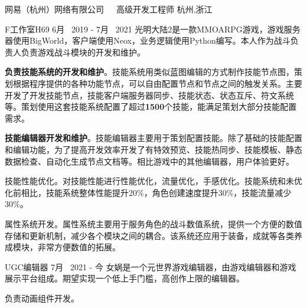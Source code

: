 


\begin{cventries}

\cventrycompany
{网易（杭州）网络有限公司~~~高级开发工程师} %
{杭州,浙江} %

\cventryproject
{F工作室H69} %
{6月~ 2019 - 7月~ 2021} %
{光明大陆2是一款MMOARPG游戏，游戏服务器使用BigWorld，客户端使用Neox，业务逻辑使用Python编写。本人作为战斗负责人负责游戏战斗模块的开发和维护。}
{ %
	\begin{cvitems}
		\item {\textbf{负责技能系统的开发和维护}。技能系统用类似蓝图编辑的方式制作技能节点图，策划根据程序提供的各种功能节点，可以自由配置节点和节点之间的触发关系。主要开发了开发技能节点，技能客户端服务器同步、技能状态、状态互斥、符文系统等。策划使用这套技能系统配置了超过\textbf{1500}个技能，能满足策划大部分技能配置需求。}
		\item{\textbf{技能编辑器开发和维护}。技能编辑器主要用于策划配置技能。除了基础的技能配置和编辑功能，为了提高开发效率开发了有特效预览、技能热同步、技能模板、静态数据检查、自动化生成节点文档等。相比游戏中的其他编辑器，用户体验更好。}
		\item{技能性能优化。对技能性能进行性能优化，流量优化，手感优化。技能系统和未优化前相比，技能系统整体性能提升20\%，角色创建速度提升30\%，技能流量减少30\%。}
		\item{属性系统开发。属性系统主要用于服务角色的战斗数值系统，提供一个方便的数值存储和更新机制，减少各个模块之间的耦合。该系统还应用于装备，成就等各类养成模块，非常方便数值的拓展。}
	\end{cvitems}
}

\cventryproject
{UGC编辑器} %
{7月~ 2021 - 今} %
{女娲是一个元世界游戏编辑器，由游戏编辑器和游戏展示平台组成。期望实现一个低上手门槛，高创作上限的编辑器。}
{ %
	\begin{cvitems}
		\item {负责动画组件开发。}
	\end{cvitems}
}


\end{cventries}

